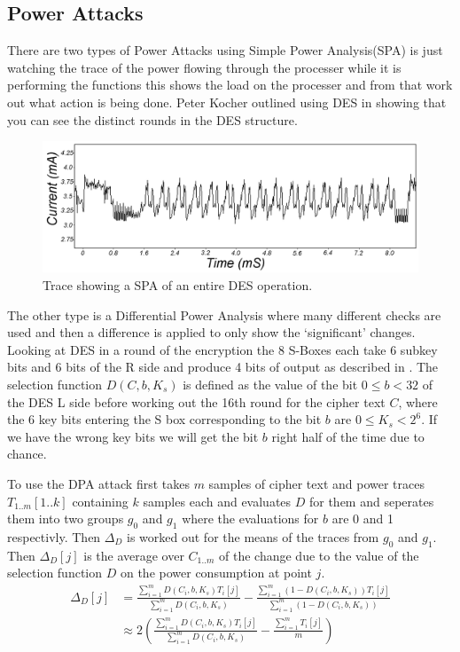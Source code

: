 \documentclass[a4paper,12pt]{article}
\begin{document}
\subsection{Power Attacks}
There are two types of Power Attacks using Simple Power Analysis(SPA) is just watching the trace of the power flowing through the processer while it is performing the functions this shows the load on the processer and from that work out what action is being done. Peter Kocher outlined using DES in \cite{kocherPower} showing that you can see the distinct rounds in the DES structure. 

\begin{figure}
    \includegraphics[width=\textwidth]{SPAtrace.png}
    \caption{Trace showing a SPA of an entire DES operation.}
    \label{fig:desRound}
\end{figure}
The other type is a Differential Power Analysis where many different checks are used and then a difference is applied to only show the `significant' changes. Looking at DES in a round of the encryption the 8 S-Boxes each take 6 subkey bits and 6 bits of the R side and produce 4 bits of output as described in \cite{otherPaper}. The selection function $D(C,b,K_s)$ is defined as the value of the bit $0 \le b < 32$ of the DES L side before working out the 16th round for the cipher text $C$, where the 6 key bits entering the S box corresponding to the bit $b$ are $0 \le K_s < 2^6$. If we have the wrong key bits we will get the bit $b$ right half of the time due to chance. 

To use the DPA attack first takes $m$ samples of cipher text and power traces $T_{1..m}[1..k]$ containing $k$ samples each and evaluates $D$ for them and seperates them into two groups $g_0$ and $g_1$ where the evaluations for $b$ are 0 and 1 respectivly. Then $\Delta_D$ is worked out for the means of the traces from $g_0$ and $g_1$. Then $\Delta_D[j]$ is the average over $C_{1..m}$ of the change due to the value of the selection function $D$ on the power consumption at point $j$. 
\begin{align}
    \Delta_D[j] &= \frac{\sum_{i=1}^mD(C_i,b,K_s)T_i[j]}{\sum_{i=1}^mD(C_i,b,K_s)} -  \frac{\sum_{i=1}^m(1-D(C_i,b,K_s))T_i[j]}{\sum_{i=1}^m(1-D(C_i,b,K_s))}\\
    &\approx 2( \frac{\sum_{i=1}^mD(C_i,b,K_s)T_i[j]}{\sum_{i=1}^mD(C_i,b,K_s)} - \frac{\sum_{i=1}^mT_i[j]}{m}) 
\end{align}
\end{document}

